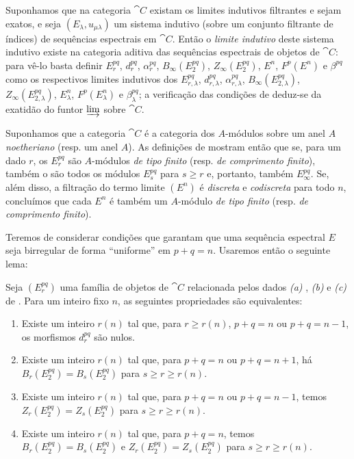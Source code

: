 \begin{env}[11.1.7]
\label{0.11.1.7}
Suponhamos que na categoria $\cat{C}$ existam os limites indutivos filtrantes e sejam exatos, e seja $(E_\lambda,u_{\mu\lambda})$ um sistema indutivo (sobre um conjunto filtrante de índices) de sequências espectrais em $\cat{C}$.
Então o \emph{limite indutivo} deste sistema indutivo existe na categoria aditiva das sequências espectrais de objetos de $\cat{C}$: para vê-lo basta definir $E_r^{pq}$, $d_r^{pq}$, $\alpha_r^{pq}$, $B_\infty(E_2^{pq})$, $Z_\infty(E_2^{pq})$, $E^n$, $F^p(E^n)$ e $\beta^{pq}$ como os respectivos limites indutivos dos $E_{r,\lambda}^{pq}$, $d_{r,\lambda}^{pq}$, $\alpha_{r,\lambda}^{pq}$, $B_\infty(E_{2,\lambda}^{pq})$, $Z_\infty(E_{2,\lambda}^{pq})$, $E_\lambda^n$, $F^p(E_\lambda^n)$ e $\beta_\lambda^{pq}$; a verificação das condições de  deduz-se da exatidão do funtor $\varinjlim$ sobre $\cat{C}$.
\end{env}

\begin{remark}[11.1.8]
\label{0.11.1.8}
Suponhamos que a categoria $\cat{C}$ é a categoria dos $A$-módulos sobre um anel $A$ \emph{noetheriano} (resp. um anel $A$).
As definições de  mostram então que se, para um dado $r$, os $E_r^{pq}$ são $A$-módulos \emph{de tipo finito} (resp. \emph{de comprimento finito}), também o são todos os módulos $E_s^{pq}$ para $s\geq r$ e, portanto, também $E_\infty^{pq}$.
Se, além disso, a filtração do termo limite $(E^n)$ é \emph{discreta} e \emph{codiscreta} para todo $n$, concluímos que cada $E^n$ é também um $A$-módulo \emph{de tipo finito} (resp. \emph{de comprimento finito}).
\end{remark}

\begin{env}[11.1.9]
\label{0.11.1.9}
Teremos de considerar condições que garantam que uma sequência espectral $E$ seja birregular de forma ``uniforme'' em $p+q=n$.
Usaremos então o seguinte lema:
\end{env}

\begin{lemma}[11.1.10]
\label{0.11.1.10}
Seja $(E_r^{pq})$ uma família de objetos de $\cat{C}$ relacionada pelos dados \emph{(a) }, \emph{(b) } e \emph{(c) } de .
Para um inteiro fixo $n$, as seguintes propriedades são equivalentes:
\begin{enumerate}
  \item[{\rm(a) }] Existe um inteiro $r(n)$ tal que, para $r\geq r(n)$, $p+q=n$ ou $p+q=n-1$, os morfismos $d_r^{pq}$ são nulos.
  \item[{\rm(b) }] Existe um inteiro $r(n)$ tal que, para $p+q=n$ ou $p+q=n+1$, há $B_r(E_2^{pq})=B_s(E_2^{pq})$ para $s\geq r\geq r(n)$.
  \item[{\rm(c) }] Existe um inteiro $r(n)$ tal que, para $p+q=n$ ou $p+q=n-1$, temos $Z_r(E_2^{pq})=Z_s(E_2^{pq})$ para $s\geq r\geq r(n)$.
  \item[{\rm(d) }] Existe um inteiro $r(n)$ tal que, para $p+q=n$, temos $B_r(E_2^{pq})=B_s(E_2^{pq})$ e $Z_r(E_2^{pq})=Z_s(E_2^{pq})$ para $s\geq r\geq r(n)$.
\end{enumerate}
\end{lemma}

